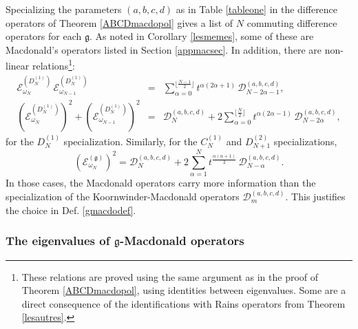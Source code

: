 \documentclass[12pt]{amsart}
\newcommand{\g}{{\mathfrak{g}}}
\newcommand{\al}{{\alpha}}
\numberwithin{equation}{section}
\begin{document}
Specializing the parameters $(a,b,c,d)$ as in Table \ref{tableone} in the difference operators of Theorem \ref{ABCDmacdopol} gives 
a list of $N$ commuting difference operators for each $\g$.
%
As noted in Corollary \ref{lesmemes}, some of these are Macdonald's operators listed in Section \ref{appmacsec}.
%
%
In addition, there are non-linear relations\footnote{These relations are proved using the same argument as in the proof of Theorem \ref{ABCDmacdopol}, using identities between eigenvalues. Some are a direct consequence of the identifications with Rains operators from Theorem \ref{lesautres}.}:
\begin{eqnarray*}
{\mathcal E}_{\omega_N}^{(D_N^{(1)})}\,{\mathcal E}_{\omega_{N-1}}^{(D_N^{(1)})}&=&\sum_{\al=0}^{\lfloor \frac{N-1}{2} \rfloor} t^{\al(2\al+1)}\, {\mathcal D}^{(a,b,c,d)}_{N-2\al-1},\\
({\mathcal E}_{\omega_N}^{(D_N^{(1)})})^2+({\mathcal E}_{\omega_{N-1}}^{(D_N^{(1)})})^2&=&{\mathcal D}_{N}^{(a,b,c,d)}
+2\sum_{\al=0}^{\lfloor \frac{N}{2} \rfloor} t^{\al(2\al-1)}\,  {\mathcal D}^{(a,b,c,d)}_{N-2\al},
\end{eqnarray*}
for the $D_N^{(1)}$ specialization. 
%
Similarly, for the $C_N^{(1)}$ and $D_{N+1}^{(2)}$ specializations,
$$\left({\mathcal E}_{\omega_N}^{(\g)}\right)^2 ={\mathcal D}_N^{(a,b,c,d)}+2\sum_{\al=1}^N t^{\frac{\al(\al+1)}{2}} \, {\mathcal D}^{(a,b,c,d)}_{N-\al}.$$
%
In those cases, the Macdonald operators carry more information than the specialization of the Koornwinder-Macdonald operators ${\mathcal D}_m^{(a,b,c,d)}$. This justifies the choice in Def. \ref{gmacdodef}.
%


%
%
%
%
%
%
%
%
%
%
%
%
%
%
%
%
%
%
%
%
%
%
%
%
%
%
%
%
%
%
%
%
%
%
%
%
%
%

%

\subsubsection{The eigenvalues of $\g$-Macdonald operators}
\label{listsec}
\end{document}
